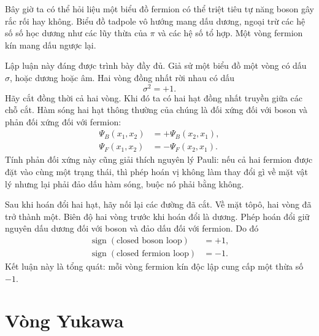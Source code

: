 Bây giờ ta có thể hỏi liệu một biểu đồ fermion có thể triệt tiêu tự năng boson gây rắc rối hay không. Biểu đồ tadpole vô hướng mang dấu dương, ngoại trừ các hệ số số học dương như các lũy thừa của \(\pi\) và các hệ số tổ hợp. Một vòng fermion kín mang dấu ngược lại.

\begin{classroomqa}
\end{classroomqa}

Lập luận này đáng được trình bày đầy đủ. Giả sử một biểu đồ một vòng có dấu \(\sigma\), hoặc dương hoặc âm. Hai vòng đồng nhất rời nhau có dấu
\begin{equation}
\sigma^2=+1.
\end{equation}
Hãy cắt đồng thời cả hai vòng. Khi đó ta có hai hạt đồng nhất truyền giữa các chỗ cắt. Hàm sóng hai hạt thông thường của chúng là đối xứng đối với boson và phản đối xứng đối với fermion:
\begin{align}
\Psi_B(x_1,x_2)&=+\Psi_B(x_2,x_1),\\
\Psi_F(x_1,x_2)&=-\Psi_F(x_2,x_1).
\end{align}
Tính phản đối xứng này cũng giải thích nguyên lý Pauli: nếu cả hai fermion được đặt vào cùng một trạng thái, thì phép hoán vị không làm thay đổi gì về mặt vật lý nhưng lại phải đảo dấu hàm sóng, buộc nó phải bằng không.

Sau khi hoán đổi hai hạt, hãy nối lại các đường đã cắt. Về mặt tôpô, hai vòng đã trở thành một. Biên độ hai vòng trước khi hoán đổi là dương. Phép hoán đổi giữ nguyên dấu dương đối với boson và đảo dấu đối với fermion. Do đó
\begin{equation}
\begin{aligned}
\operatorname{sign}(\text{closed boson loop})&=+1,\\
\operatorname{sign}(\text{closed fermion loop})&=-1.
\end{aligned}
\end{equation}
Kết luận này là tổng quát: mỗi vòng fermion kín độc lập cung cấp một thừa số \(-1\).

\section{Vòng Yukawa}

